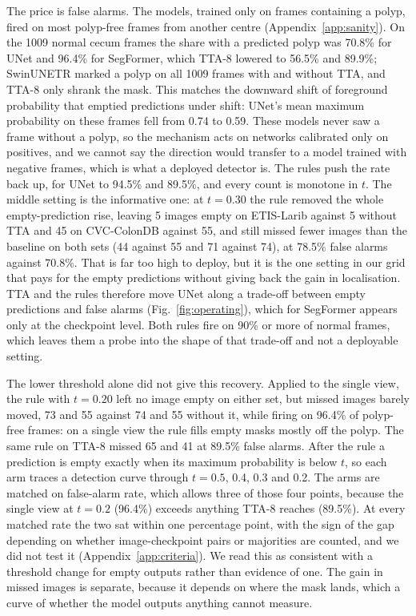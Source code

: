 The price is false alarms. The models, trained only on frames containing a polyp, fired on most polyp-free frames from another centre (Appendix~\ref{app:sanity}). On the 1009 normal cecum frames the share with a predicted polyp was 70.8\% for UNet and 96.4\% for SegFormer, which TTA-8 lowered to 56.5\% and 89.9\%; SwinUNETR marked a polyp on all 1009 frames with and without TTA, and TTA-8 only shrank the mask. This matches the downward shift of foreground probability that emptied predictions under shift: UNet's mean maximum probability on these frames fell from 0.74 to 0.59. These models never saw a frame without a polyp, so the mechanism acts on networks calibrated only on positives, and we cannot say the direction would transfer to a model trained with negative frames, which is what a deployed detector is. The rules push the rate back up, for UNet to 94.5\% and 89.5\%, and every count is monotone in $t$. The middle setting is the informative one: at $t=0.30$ the rule removed the whole empty-prediction rise, leaving 5 images empty on ETIS-Larib against 5 without TTA and 45 on CVC-ColonDB against 55, and still missed fewer images than the baseline on both sets (44 against 55 and 71 against 74), at 78.5\% false alarms against 70.8\%. That is far too high to deploy, but it is the one setting in our grid that pays for the empty predictions without giving back the gain in localisation. TTA and the rules therefore move UNet along a trade-off between empty predictions and false alarms (Fig.~\ref{fig:operating}), which for SegFormer appears only at the checkpoint level. Both rules fire on 90\% or more of normal frames, which leaves them a probe into the shape of that trade-off and not a deployable setting.

The lower threshold alone did not give this recovery. Applied to the single view, the rule with $t=0.20$ left no image empty on either set, but missed images barely moved, 73 and 55 against 74 and 55 without it, while firing on 96.4\% of polyp-free frames: on a single view the rule fills empty masks mostly off the polyp. The same rule on TTA-8 missed 65 and 41 at 89.5\% false alarms. After the rule a prediction is empty exactly when its maximum probability is below $t$, so each arm traces a detection curve through $t=0.5$, 0.4, 0.3 and 0.2. The arms are matched on false-alarm rate, which allows three of those four points, because the single view at $t=0.2$ (96.4\%) exceeds anything TTA-8 reaches (89.5\%). At every matched rate the two sat within one percentage point, with the sign of the gap depending on whether image-checkpoint pairs or majorities are counted, and we did not test it (Appendix~\ref{app:criteria}). We read this as consistent with a threshold change for empty outputs rather than evidence of one. The gain in missed images is separate, because it depends on where the mask lands, which a curve of whether the model outputs anything cannot measure.


